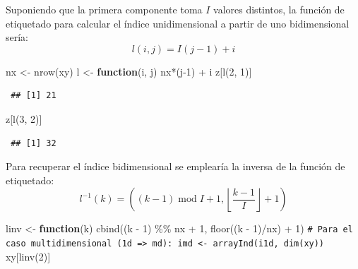 \documentclass[
]{book}
\newenvironment{Shaded}{\begin{snugshade}}{\end{snugshade}}
\newcommand{\CommentTok}[1]{\textcolor[rgb]{0.56,0.35,0.01}{\textit{#1}}}
\newcommand{\ControlFlowTok}[1]{\textcolor[rgb]{0.13,0.29,0.53}{\textbf{#1}}}
\newcommand{\DecValTok}[1]{\textcolor[rgb]{0.00,0.00,0.81}{#1}}
\newcommand{\FunctionTok}[1]{\textcolor[rgb]{0.00,0.00,0.00}{#1}}
\newcommand{\NormalTok}[1]{#1}
\newcommand{\OtherTok}[1]{\textcolor[rgb]{0.56,0.35,0.01}{#1}}
\newcommand{\SpecialCharTok}[1]{\textcolor[rgb]{0.00,0.00,0.00}{#1}}
\theoremstyle{break}
\theoremstyle{nonumberplain}
\renewcommand{\CommentTok}[1]{\textcolor[rgb]{0.41,0.41,0.41}{\texttt{#1}}}
\begin{document}
Suponiendo que la primera componente toma \(I\) valores distintos, la función de etiquetado para calcular el índice unidimensional a partir de uno bidimensional sería:
\[l(i, j) = I(j-1) + i\]

\begin{Shaded}
\begin{Highlighting}[]
\NormalTok{nx }\OtherTok{\textless{}{-}} \FunctionTok{nrow}\NormalTok{(xy)}
\NormalTok{l }\OtherTok{\textless{}{-}} \ControlFlowTok{function}\NormalTok{(i, j) nx}\SpecialCharTok{*}\NormalTok{(j}\DecValTok{{-}1}\NormalTok{) }\SpecialCharTok{+}\NormalTok{ i}
\NormalTok{z[}\FunctionTok{l}\NormalTok{(}\DecValTok{2}\NormalTok{, }\DecValTok{1}\NormalTok{)]}
\end{Highlighting}
\end{Shaded}

\begin{verbatim}
 ## [1] 21
\end{verbatim}

\begin{Shaded}
\begin{Highlighting}[]
\NormalTok{z[}\FunctionTok{l}\NormalTok{(}\DecValTok{3}\NormalTok{, }\DecValTok{2}\NormalTok{)]}
\end{Highlighting}
\end{Shaded}

\begin{verbatim}
 ## [1] 32
\end{verbatim}

Para recuperar el índice bidimensional se emplearía la inversa de la función de etiquetado:
\[l^{-1}( k )  =\left(  (k -1) \operatorname{mod} I  + 1, \left\lfloor \frac{k - 1}{I}\right\rfloor + 1\right)\]

\begin{Shaded}
\begin{Highlighting}[]
\NormalTok{linv }\OtherTok{\textless{}{-}} \ControlFlowTok{function}\NormalTok{(k) }\FunctionTok{cbind}\NormalTok{((k }\SpecialCharTok{{-}} \DecValTok{1}\NormalTok{) }\SpecialCharTok{\%\%}\NormalTok{ nx }\SpecialCharTok{+} \DecValTok{1}\NormalTok{, }\FunctionTok{floor}\NormalTok{((k }\SpecialCharTok{{-}} \DecValTok{1}\NormalTok{)}\SpecialCharTok{/}\NormalTok{nx) }\SpecialCharTok{+} \DecValTok{1}\NormalTok{)}
\CommentTok{\# Para el caso multidimensional (1d =\textgreater{} md): imd \textless{}{-} arrayInd(i1d, dim(xy))}
\NormalTok{xy[}\FunctionTok{linv}\NormalTok{(}\DecValTok{2}\NormalTok{)]}
\end{Highlighting}
\end{Shaded}
\end{document}
